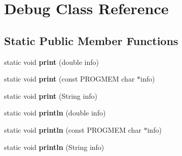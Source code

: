 \hypertarget{class_debug}{}\section{Debug Class Reference}
\label{class_debug}
\subsection*{Static Public Member Functions}
\begin{DoxyCompactItemize}
\item 
static void {\bfseries print} (double info)\hypertarget{class_debug_ad89acbb1466c676e4260cf81c49b2210}{}\label{class_debug_ad89acbb1466c676e4260cf81c49b2210}

\item 
static void {\bfseries print} (const P\+R\+O\+G\+M\+EM char $\ast$info)\hypertarget{class_debug_a8dc69dea7a41a650305fe39ecd041ea2}{}\label{class_debug_a8dc69dea7a41a650305fe39ecd041ea2}

\item 
static void {\bfseries print} (String info)\hypertarget{class_debug_a3881a087329fd06da726f4f1bb1779fb}{}\label{class_debug_a3881a087329fd06da726f4f1bb1779fb}

\item 
static void {\bfseries println} (double info)\hypertarget{class_debug_ae3a81b2a67d642065dabc9f8bac8a140}{}\label{class_debug_ae3a81b2a67d642065dabc9f8bac8a140}

\item 
static void {\bfseries println} (const P\+R\+O\+G\+M\+EM char $\ast$info)\hypertarget{class_debug_a50ff4dacbab49f4ed0b24605498a71f9}{}\label{class_debug_a50ff4dacbab49f4ed0b24605498a71f9}

\item 
static void {\bfseries println} (String info)\hypertarget{class_debug_ac151110846064657ecc902c53900b942}{}\label{class_debug_ac151110846064657ecc902c53900b942}

\end{DoxyCompactItemize}
